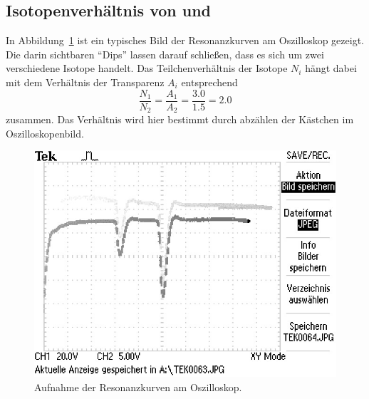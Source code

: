 \subsection{Isotopenverhältnis von  und }
\label{sub:isotopenverhältnis_von_85_rb}

In Abbildung~\ref{fig:TEK} ist ein typisches Bild der Resonanzkurven am
Oszilloskop gezeigt. Die darin sichtbaren \enquote{Dips} lassen darauf
schließen, dass es sich um zwei verschiedene Isotope handelt.
Das Teilchenverhältnis der Isotope $N_i$ hängt dabei mit dem Verhältnis
der Transparenz $A_i$ entsprechend
\begin{equation}
  \frac{N_1}{N_2} = \frac{A_1}{A_2} = \frac{3.0}{1.5} = 2.0
\end{equation}
zusammen. Das Verhältnis wird hier bestimmt durch abzählen der Kästchen im
Oszilloskopenbild.

\begin{figure}[htpb]
  \centering
  \includegraphics[scale=1.0]{bilder/TEK0066_rotated.JPG}
  \caption{Aufnahme der Resonanzkurven am Oszilloskop.}
\label{fig:TEK}
\end{figure}
